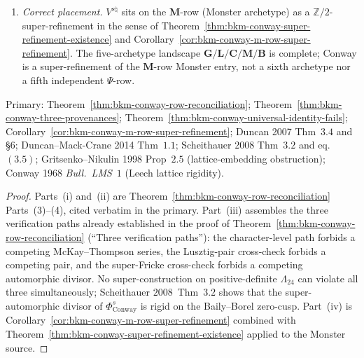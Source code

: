 \begin{theorem}
\begin{enumerate}[label=\textup{(\roman*)}]
forbidding an independent character.
Path~(ii): $48/24 = 2$ and $-1/48 \cdot 24 = -1/2$ match the
Monster pair exactly
(Theorem~\ref{thm:bkm-conway-universal-identity-fails}),
forbidding an independent Lusztig pair.
Path~(iii): Scheithauer~$2008$ eq.~$(3.5)$ identifies
$\Phi^s_{\mathrm{Conway}}$'s divisor as the diamond twist of
$\Phi_{12}|_{\Lambda_{24}}$, forbidding an independent
automorphic divisor on $\Lambda_{24}$.
\item \emph{Correct placement.} $V^{s\natural}$ sits on the
$\mathbf{M}$-row (Monster archetype) as a
$\mathbb{Z}/2$-super-refinement in the sense of
Theorem~\ref{thm:bkm-conway-super-refinement-existence} and
Corollary~\ref{cor:bkm-conway-m-row-super-refinement}. The
five-archetype landscape $\mathbf{G}/\mathbf{L}/\mathbf{C}/
\mathbf{M}/\mathbf{B}$ is complete; Conway is a super-refinement
of the $\mathbf{M}$-row Monster entry, not a sixth archetype
nor a fifth independent $\Psi$-row.
\end{enumerate}
Primary:
Theorem~\ref{thm:bkm-conway-row-reconciliation};
Theorem~\ref{thm:bkm-conway-three-provenances};
Theorem~\ref{thm:bkm-conway-universal-identity-fails};
Corollary~\ref{cor:bkm-conway-m-row-super-refinement};
Duncan 2007 Thm~$3.4$ and \S$6$;
Duncan--Mack-Crane 2014 Thm~$1.1$;
Scheithauer 2008 Thm~$3.2$ and eq.~$(3.5)$;
Gritsenko--Nikulin 1998 Prop~$2.5$
(lattice-embedding obstruction);
Conway 1968 \emph{Bull.~LMS}~$1$ (Leech lattice rigidity).
\end{theorem}

\begin{proof}[Proof]
Parts~(i) and~(ii) are
Theorem~\ref{thm:bkm-conway-row-reconciliation}
Parts~(3)--(4), cited verbatim in the primary.
Part~(iii) assembles the three verification paths already
established in the proof of
Theorem~\ref{thm:bkm-conway-row-reconciliation}
\textup{(``Three verification paths'')}: the character-level
path forbids a competing McKay--Thompson series, the Lusztig-pair
cross-check forbids a competing pair, and the super-Fricke
cross-check forbids a competing automorphic divisor. No
super-construction on positive-definite $\Lambda_{24}$ can
violate all three simultaneously; Scheithauer $2008$~Thm~$3.2$
shows that the super-automorphic divisor of
$\Phi^s_{\mathrm{Conway}}$ is rigid on the Baily--Borel zero-cusp.
Part~(iv) is
Corollary~\ref{cor:bkm-conway-m-row-super-refinement} combined
with Theorem~\ref{thm:bkm-conway-super-refinement-existence}
applied to the Monster source.
\end{proof}

